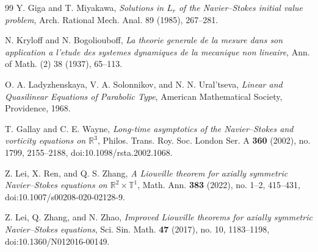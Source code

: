 \documentclass[11pt]{amsart}
\theoremstyle{plain}
\theoremstyle{definition}
\theoremstyle{remark}
\numberwithin{equation}{section}
\begin{document}
\begin{thebibliography}{99}
Y. Giga and T. Miyakawa,
\emph{Solutions in \(L_r\) of the Navier--Stokes initial value problem},
Arch. Rational Mech. Anal. 89 (1985), 267--281.

N. Kryloff and N. Bogoliouboff,
\emph{La theorie generale de la mesure dans son application a l'etude des
systemes dynamiques de la mecanique non lineaire},
Ann. of Math. (2) 38 (1937), 65--113.

O. A. Ladyzhenskaya, V. A. Solonnikov, and N. N. Ural'tseva,
\emph{Linear and Quasilinear Equations of Parabolic Type},
American Mathematical Society, Providence, 1968.

T. Gallay and C. E. Wayne,
\emph{Long-time asymptotics of the Navier--Stokes and vorticity equations on
\(\mathbb R^3\)},
Philos. Trans. Roy. Soc. London Ser. A \textbf{360} (2002), no. 1799,
2155--2188, doi:10.1098/rsta.2002.1068.

Z. Lei, X. Ren, and Q. S. Zhang,
\emph{A Liouville theorem for axially symmetric Navier--Stokes equations on
\(\mathbb R^2\times\mathbb T^1\)},
Math. Ann. \textbf{383} (2022), no. 1--2, 415--431,
doi:10.1007/s00208-020-02128-9.

Z. Lei, Q. Zhang, and N. Zhao,
\emph{Improved Liouville theorems for axially symmetric Navier--Stokes
equations},
Sci. Sin. Math. \textbf{47} (2017), no. 10, 1183--1198,
doi:10.1360/N012016-00149.

\end{thebibliography}
\end{document}
